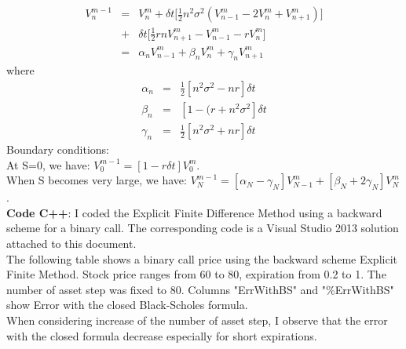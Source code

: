 \documentclass[11pt,oneside,a4paper, titlepage]{article}
\begin{document}
\begin{eqnarray*}
V_{n}^{m-1} &=& V_{n}^{m} + \delta t \bigg[ \frac{1}{2} n^2\sigma^2(V_{n-1}^{m}-2V_{n}^{m}+V_{n+1}^{m}) \bigg] \\
			&+& \delta t \bigg[  \frac{1}{2}r n V_{n+1}^{m}-V_{n-1}^{m} -rV_{n}^{m}  \bigg]\\
			&=& \alpha_n V_{n-1}^{m} + \beta_n V_{n}^{m} + \gamma_n V_{n+1}^{m}
\end{eqnarray*}
where 
\begin{eqnarray*}
\alpha_n &=& \frac{1}{2} [n^2\sigma^2-nr]\delta t\\
\beta_n &=& [1-(r+n^2\sigma^2]\delta t \\
\gamma_n &=& \frac{1}{2}[n^2\sigma^2+nr]\delta t
\end{eqnarray*}
Boundary conditions:\\
At S=0, we have: \(V_0^{m-1}=[1-r\delta t]V_0^{m}\).\\
When S becomes very large, we have: \(V_N^{m-1}=[\alpha_N-\gamma_N]V_{N-1}^{m}+[\beta_N+2\gamma_N]V_{N}^{m}\).\\
\textbf{Code C++}: I coded the Explicit Finite Difference Method using a backward scheme for a binary call. The corresponding code is a Visual Studio 2013 solution attached to this document.\\
The following table shows a binary call price using the backward scheme Explicit Finite Method. Stock price ranges from 60 to 80, expiration from 0.2 to 1. The number of asset step was fixed to 80. Columns "ErrWithBS" and "\%ErrWithBS" show Error with the closed Black-Scholes formula.\\
When considering increase of the number of asset step, I observe that the error with the closed formula decrease especially for short expirations.
\vskip 0.2cm
\end{document}
